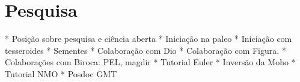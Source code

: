 \chapter{Pesquisa}

* Posição sobre pesquisa e ciência aberta
* Iniciação na paleo
* Iniciação com tesseroides
* Sementes
* Colaboração com Dio
* Colaboração com Figura.
* Colaborações com Biroca: PEL, magdir
* Tutorial Euler
* Inversão da Moho
* Tutorial NMO
* Posdoc GMT
